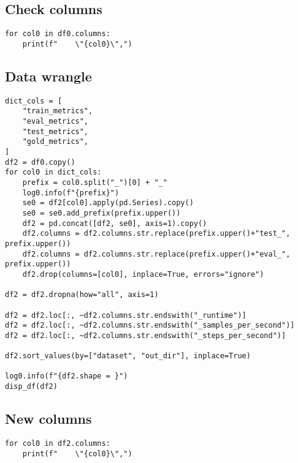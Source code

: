 \documentclass[a4paper,10pt,onecolumn,oneside,openright]{article}
\begin{document}
\subsection{Check columns}
\label{sec:org4ceb5bc}
\begin{verbatim}
for col0 in df0.columns:
    print(f"    \"{col0}\",")
\end{verbatim}
\subsection{Data wrangle}
\label{sec:orgf2e3822}
\begin{verbatim}
dict_cols = [
    "train_metrics",
    "eval_metrics",
    "test_metrics",
    "gold_metrics",
]
df2 = df0.copy()
for col0 in dict_cols:
    prefix = col0.split("_")[0] + "_"
    log0.info(f"{prefix}")
    se0 = df2[col0].apply(pd.Series).copy()
    se0 = se0.add_prefix(prefix.upper())
    df2 = pd.concat([df2, se0], axis=1).copy()
    df2.columns = df2.columns.str.replace(prefix.upper()+"test_", prefix.upper())
    df2.columns = df2.columns.str.replace(prefix.upper()+"eval_", prefix.upper())
    df2.drop(columns=[col0], inplace=True, errors="ignore")

df2 = df2.dropna(how="all", axis=1)

df2 = df2.loc[:, ~df2.columns.str.endswith("_runtime")]
df2 = df2.loc[:, ~df2.columns.str.endswith("_samples_per_second")]
df2 = df2.loc[:, ~df2.columns.str.endswith("_steps_per_second")]

df2.sort_values(by=["dataset", "out_dir"], inplace=True)

log0.info(f"{df2.shape = }")
disp_df(df2)
\end{verbatim}
\subsection{New columns}
\label{sec:orgdeb09b8}
\begin{verbatim}
for col0 in df2.columns:
    print(f"    \"{col0}\",")
\end{verbatim}
\end{document}
